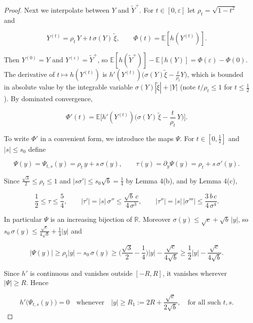 \documentclass[aip,jmp,preprint,onecolumn,floatfix,superscriptaddress,nofootinbib,11pt]{revtex4-2}
\theoremstyle{plain}
\theoremstyle{remark}
\numberwithin{equation}{section}
\newcommand{\E}{\mathbb{E}}
\newcommand{\eps}{\varepsilon}
\begin{document}
\begin{proof}
Next we interpolate between $Y$ and $\tilde Y^{+}$. For $t\in[0,\eps]$ let $\rho_t=\sqrt{1-t^{2}}$ and

\begin{equation*}
Y^{(t)}=\rho_t\,Y+t\,\sigma(Y)\,\tilde\xi,\qquad \Phi(t)=\E[h(Y^{(t)})].
\end{equation*}

Then $Y^{(0)}=Y$ and $Y^{(\eps)}=\tilde Y^{+}$, so $\E[h(\tilde Y^{+})]-\E[h(Y)]=\Phi(\eps)-\Phi(0)$. The derivative of $t\mapsto h(Y^{(t)})$ is $h'(Y^{(t)})\big(\sigma(Y)\tilde\xi-\tfrac{t}{\rho_t}Y\big)$, which is bounded in absolute value by the integrable variable $\sigma(Y)|\tilde\xi|+|Y|$ (note $t/\rho_t\le1$ for $t\le\tfrac12$). By dominated convergence,

\begin{equation*}
\Phi'(t)=\E\Big[h'(Y^{(t)})\Big(\sigma(Y)\,\tilde\xi-\frac{t}{\rho_t}\,Y\Big)\Big].
\end{equation*}

To write $\Phi'$ in a convenient form, we introduce the maps $\Psi$. For $t\in[0,\tfrac12]$ and $|s|\le s_0$ define

\begin{equation*}
\Psi(y)=\Psi_{t,s}(y)=\rho_t\,y+s\,\sigma(y),\qquad \tau(y)=\partial_y\Psi(y)=\rho_t+s\,\sigma'(y).
\end{equation*}

Since $\tfrac{\sqrt3}{2}\le\rho_t\le1$ and $|s\sigma'|\le s_0\sqrt b=\tfrac14$ by Lemma 4(b), and by Lemma 4(c),

\begin{equation}
\frac12\le\tau\le\frac54,\qquad |\tau'|=|s|\,\sigma''\le\frac{\sqrt b\,c}{4\,\sigma^{3}},\qquad |\tau''|=|s|\,|\sigma'''|\le\frac{3\,b\,c}{4\,\sigma^{4}} .
\label{eq:4.10}
\end{equation}

In particular $\Psi$ is an increasing bijection of $\mathbb R$. Moreover $\sigma(y)\le\sqrt c+\sqrt b\,|y|$, so $s_0\,\sigma(y)\le\tfrac{\sqrt c}{4\sqrt b}+\tfrac14|y|$ and

\begin{equation*}
|\Psi(y)|\ge\rho_t|y|-s_0\,\sigma(y)\ge\Big(\frac{\sqrt3}{2}-\frac14\Big)|y|-\frac{\sqrt c}{4\sqrt b}\ge\frac12|y|-\frac{\sqrt c}{4\sqrt b}.
\end{equation*}

Since $h'$ is continuous and vanishes outside $[-R,R]$, it vanishes wherever $|\Psi|\ge R$. Hence

\begin{equation*}
h'\big(\Psi_{t,s}(y)\big)=0\quad\text{whenever}\quad|y|\ge R_1:=2R+\frac{\sqrt c}{2\sqrt b},\quad\text{for all such }t,s.
\end{equation*}


\end{proof}
\end{document}
